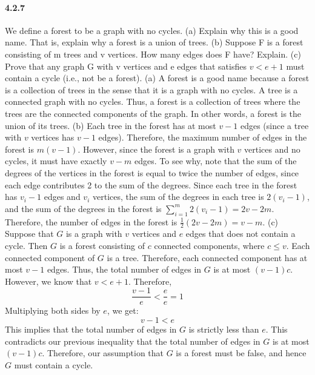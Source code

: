 \documentclass{article}
\begin{document}
 \paragraph{4.2.7}
We define a forest to be a graph with no cycles.\newline
(a) Explain why this is a good name. That is, explain why a forest is
a union of trees.\newline
(b) Suppose F is a forest consisting of m trees and v vertices. How
many edges does F have? Explain.\newline
(c) Prove that any graph G with v vertices and e edges that satisfies
$v < e + 1$ must contain a cycle (i.e., not be a forest).\newline
(a) A forest is a good name because a forest is a collection of trees in the sense that it is a graph with no cycles. A tree is a connected graph with no cycles. Thus, a forest is a collection of trees where the trees are the connected components of the graph. In other words, a forest is the union of its trees.\newline
(b) Each tree in the forest has at most $v-1$ edges (since a tree with $v$ vertices has $v-1$ edges). Therefore, the maximum number of edges in the forest is $m(v-1)$. However, since the forest is a graph with $v$ vertices and no cycles, it must have exactly $v-m$ edges. To see why, note that the sum of the degrees of the vertices in the forest is equal to twice the number of edges, since each edge contributes 2 to the sum of the degrees. Since each tree in the forest has $v_i-1$ edges and $v_i$ vertices, the sum of the degrees in each tree is $2(v_i-1)$, and the sum of the degrees in the forest is $\sum_{i=1}^m 2(v_i-1) = 2v-2m$. Therefore, the number of edges in the forest is $\frac{1}{2}(2v-2m) = v-m$.\newline
(c) Suppose that $G$ is a graph with $v$ vertices and $e$ edges that does not contain a cycle. Then $G$ is a forest consisting of $c$ connected components, where $c \leq v$. Each connected component of $G$ is a tree. Therefore, each connected component has at most $v-1$ edges. Thus, the total number of edges in $G$ is at most $(v-1)c$.\newline
However, we know that $v < e+1$. Therefore,\newline
$$\frac{v-1}{e} < \frac{e}{e} = 1$$\newline
Multiplying both sides by $e$, we get:
$$v-1 < e$$
This implies that the total number of edges in $G$ is strictly less than $e$. This contradicts our previous inequality that the total number of edges in $G$ is at most $(v-1)c$. Therefore, our assumption that $G$ is a forest must be false, and hence $G$ must contain a cycle.
\end{document}
